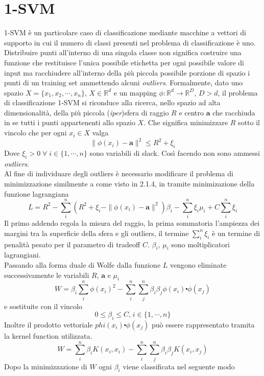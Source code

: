 \documentclass [10pt,a4paper,twoside,openright] {book}
\begin{document}
\section{1-SVM}
1-SVM è un particolare caso di classificazione mediante macchine a vettori di supporto in cui il numero di classi presenti nel problema di classificazione è uno. Distribuire punti all'interno di una singola classe non significa costruire una funzione che restituisce l'unica possibile etichetta per ogni possibile valore di input ma racchiudere all'interno della più piccola possibile porzione di spazio i punti di un training set ammettendo alcuni \textit{outliers}. Formalmente, dato uno spazio $X = \lbrace x_1, x_2, \cdots, x_n \rbrace$, $X \in \mathbb{R}^d$ e un mapping $\phi : \mathbb{R}^d \rightarrow \mathbb{R}^D$, $D > d$, il problema di classificazione 1-SVM si riconduce alla ricerca, nello spazio ad alta dimensionalità, della più piccola (\textit{iper})sfera di raggio $R$ e centro $\mathbf{a}$ che racchiuda in se tutti i punti appartenenti allo spazio $X$. Che significa minimizzare $R$ sotto il vincolo che per ogni $x_i \in X$ valga
\[
\parallel \phi(x_i) - \mathbf{a} \parallel^2 \leq R^2 + \xi_i
\]
Dove $\xi_i > 0 \; \forall \; i \in \lbrace 1, \cdots, n \rbrace$ sono variabili di slack. Così facendo non sono ammessi \textit{outliers}.\\
Al fine di individuare degli outliers è necessario modificare il problema di minimizzazione similmente a come visto in 2.1.4, in \cite{ben2001support} tramite minimizazione della funzione lagrangiana
\[
L = R^2 - \sum_i^n ( R^2 + \xi_i - \parallel \phi(x_i) - \mathbf{a} \parallel^2 ) \beta_i - \sum_i^n \xi_i\mu_i + C \sum_i^n \xi_i 
\]
Il primo addendo regola la misura del raggio, la prima sommatoria l'ampiezza dei margini tra la superficie della sfera e gli outliers, il termine $ \sum_i^n \xi_i$ è un termine di penalità pesato per il parametro di tradeoff $C$. $\beta_i$, $\mu_i$ sono moltiplicatori lagrangiani.\\
Passando alla forma duale di Wolfe dalla funzione $L$ vengono eliminate successivamente le variabili $R$, $\mathbf{a}$ e $\mu_i$
\[
W = \beta_i  \sum_i^n \phi(x_i)^2- \sum_i^n\sum_j^n \beta_i \beta_j \phi(x_i) \centerdot \phi(x_j)
\]
e sostituite con il vincolo
\[
0 \leq \beta_i \leq C \text{,} \; i \in \lbrace 1, \cdots, n \rbrace
\]
Inoltre il prodotto vettoriale $phi(x_i) \centerdot \phi(x_j)$ può essere rappresentato tramita la kernel function utilizzata.
\[
W = \sum_i^n \beta_i K(x_i,x_i) - \sum_i^n\sum_j^n \beta_i \beta_j K(x_i,x_j)
\]
Dopo la minimizzazione di $W$ ogni $\beta_i$ viene classificata nel seguente modo
\end{document}
